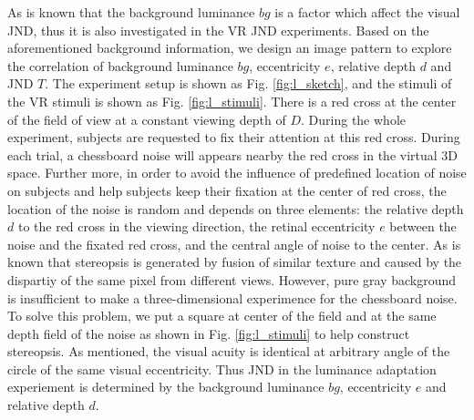 \documentclass[journal]{IEEEtran}
\begin{document}
As is known that the background luminance $bg$ is a factor which affect the visual JND, thus it is also investigated in the VR JND experiments. Based on the aforementioned background information, we design an image pattern to explore the correlation of background luminance $bg$, eccentricity $e$, relative depth $d$ and JND $T$. The experiment setup is shown as Fig. \ref{fig:l_sketch}, and the stimuli of the VR stimuli is shown as Fig. \ref{fig:l_stimuli}. There is a red cross at the center of the field of view at a constant viewing depth of $D$. During the whole experiment, subjects are requested to fix their attention at this red cross. During each trial, a chessboard noise will appears nearby the red cross in the virtual 3D space. Further more, in order to avoid the influence of predefined location of noise on subjects and help subjects keep their fixation at the center of red cross, the location of the noise is random and depends on three elements: the relative depth $d$ to the red cross in the viewing direction, the retinal eccentricity $e$ between the noise and the fixated red cross, and the central angle of noise to the center. As is known that stereopsis is generated by fusion of similar texture and caused by the dispartiy of the same pixel from different views. However, pure gray background is insufficient to make a three-dimensional experimence for the chessboard noise. To solve this problem, we put a square at center of the field and at the same depth field of the noise as shown in Fig. \ref{fig:l_stimuli} to help construct stereopsis. As mentioned, the visual acuity is identical at arbitrary angle of the circle of the same visual eccentricity. Thus JND in the luminance adaptation experiement is determined by the background luminance $bg$, eccentricity $e$ and relative depth $d$. 
\end{document}
